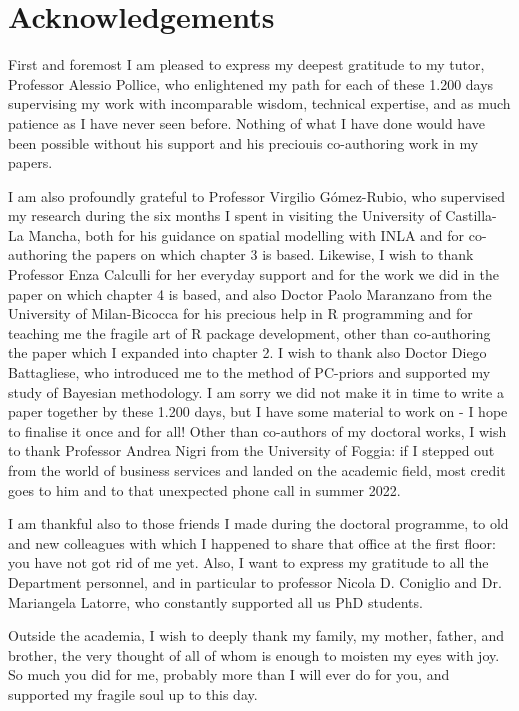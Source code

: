 \documentclass[openany, 11pt, oneside]{book}
\begin{document}
\section*{Acknowledgements}
\begin{small}
First and foremost I am pleased to express my deepest gratitude to my tutor, Professor Alessio Pollice, who enlightened my path for each of these 1.200 days supervising my work with incomparable wisdom, technical expertise, and as much patience as I have never seen before. Nothing of what I have done would have been possible without his support and his preciouis co-authoring work in my papers.

I am also profoundly grateful to Professor Virgilio Gómez-Rubio, who supervised my research during the six months I spent in visiting the University of Castilla-La Mancha, both for his guidance on spatial modelling with INLA and for co-authoring the papers on which chapter 3 is based. Likewise, I wish to thank Professor Enza Calculli for her everyday support and for the work we did in the paper on which chapter 4 is based, and also Doctor Paolo Maranzano from the University of Milan-Bicocca for his precious help in R programming and for teaching me the fragile art of R package development, other than co-authoring the paper which I expanded into chapter 2. I wish to thank also Doctor Diego Battagliese, who introduced me to the method of PC-priors and supported my study of Bayesian methodology. I am sorry we did not make it in time to write a paper together by these 1.200 days, but I have some material to work on - I hope to finalise it once and for all! Other than co-authors of my doctoral works, I wish to thank Professor Andrea Nigri from the University of Foggia: if I stepped out from the world of business services and landed on the academic field, most credit goes to him and to that unexpected phone call in summer 2022. 

I am thankful also to those friends I made during the doctoral programme, to old and new colleagues with which I happened to share that office at the first floor: you have not got rid of me yet. Also, I want to express my gratitude to all the Department personnel, and in particular to professor Nicola D. Coniglio and Dr. Mariangela Latorre, who constantly supported all us PhD students.

Outside the academia, I wish to deeply thank my family, my mother, father, and brother, the very thought of all of whom is enough to moisten my eyes with joy. So much you did for me, probably more than I will ever do for you, and supported my fragile soul up to this day.
\end{small}
\end{document}
